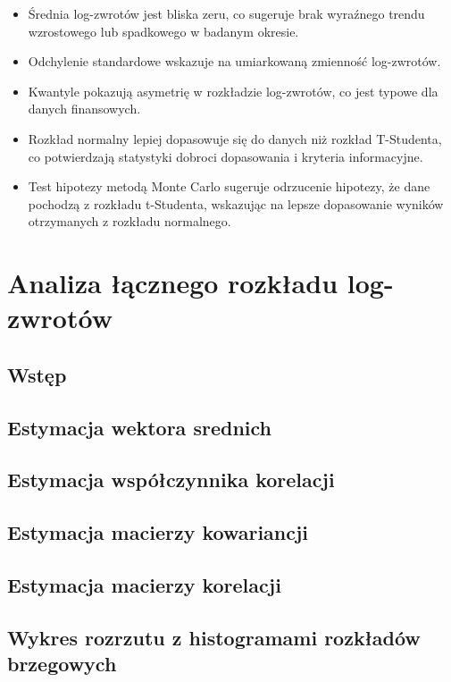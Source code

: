 \documentclass[a4paper,11pt]{article}
\begin{document}
\begin{itemize}
    \item Średnia log-zwrotów jest bliska zeru, co sugeruje brak wyraźnego trendu wzrostowego lub spadkowego w badanym okresie.
    \item Odchylenie standardowe wskazuje na umiarkowaną zmienność log-zwrotów.
    \item Kwantyle pokazują asymetrię w rozkładzie log-zwrotów, co jest typowe dla danych finansowych.
    \item Rozkład normalny lepiej dopasowuje się do danych niż rozkład T-Studenta, co potwierdzają statystyki dobroci dopasowania i kryteria informacyjne.
    \item Test hipotezy metodą Monte Carlo sugeruje odrzucenie hipotezy, że dane pochodzą z rozkładu t-Studenta, wskazując na lepsze dopasowanie wyników otrzymanych z rozkładu normalnego.
\end{itemize}

\newpage\section{Analiza łącznego rozkładu log-zwrotów}

\subsection{Wstęp}

\subsection{Estymacja wektora srednich}

\subsection{Estymacja współczynnika korelacji}

\subsection{Estymacja macierzy kowariancji}

\subsection{Estymacja macierzy korelacji}

\subsection{Wykres rozrzutu z histogramami rozkładów brzegowych}
\end{document}
